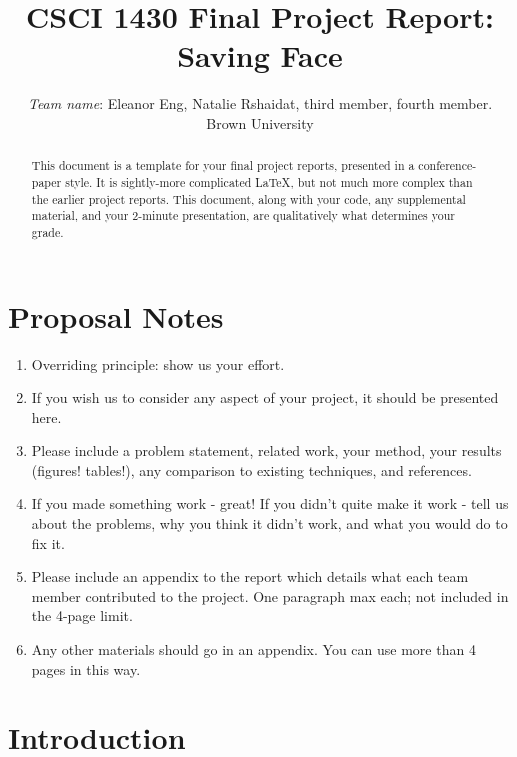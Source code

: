 \documentclass[10pt,twocolumn,letterpaper]{article}
\begin{document}
\title{CSCI 1430 Final Project Report:\\Saving Face}

\author{\emph{Team name}: Eleanor Eng, Natalie Rshaidat, third member, fourth member.\\
Brown University\\
}

\maketitle

\begin{abstract}
This document is a template for your final project reports, presented in a conference-paper style. It is sightly-more complicated LaTeX, but not much more complex than the earlier project reports. This document, along with your code, any supplemental material, and your 2-minute presentation, are qualitatively what determines your grade. 
\end{abstract}


\section{Proposal Notes}

\begin{enumerate}
    \item Overriding principle: show us your effort.
    \item If you wish us to consider any aspect of your project, it should be presented here. \item Please include a problem statement, related work, your method, your results (figures! tables!), any comparison to existing techniques, and references. 
    \item If you made something work - great! If you didn't quite make it work - tell us about the problems, why you think it didn't work, and what you would do to fix it.
    \item Please include an appendix to the report which details what each team member contributed to the project. One paragraph max each; not included in the 4-page limit.
    \item Any other materials should go in an appendix. You can use more than 4 pages in this way.
\end{enumerate}


\section{Introduction}
\end{document}
